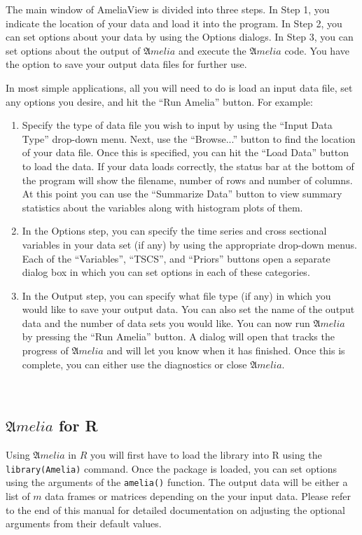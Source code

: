 \documentclass[12pt,titlepage]{article}
\newcommand{\Amelia}{\ensuremath{\mathfrak Amelia} }
\begin{document}
The main window of AmeliaView is divided into three steps.  In Step 1,
you indicate the location of your data and load it into the program.
In Step 2, you can set options about your data by using the Options
dialogs.  In Step 3, you can set options about the output of
${\mathfrak Amelia}$ and execute the ${\mathfrak Amelia}$ code.  You
have the option to save your output data files for further use.

In most simple applications, all you will need to do is load an input
data file, set any options you desire, and hit the ``Run Amelia''
button.  For example:
\begin{enumerate}
\item Specify the type of data file you wish to input by using the
  ``Input Data Type'' drop-down menu.  Next, use the ``Browse...''
  button to find the location of your data file.  Once this is
  specified, you can hit the ``Load Data'' button to load the data.
  If your data loads correctly, the status bar at the bottom of the
  program will show the filename, number of rows and number of
  columns.  At this point you can use the ``Summarize Data'' button to
  view summary statistics about the variables along with histogram
  plots of them.
\item In the Options step, you can specify the time series and cross
  sectional variables in your data set (if any) by using the
  appropriate drop-down menus.  Each of the ``Variables'', ``TSCS'',
  and ``Priors'' buttons open a separate dialog box in which you can
  set options in each of these categories.
\item In the Output step, you can specify what file type (if any) in
  which you would like to save your output data.  You can also set the
  name of the output data and the number of data sets you would like.
  You can now run ${\mathfrak Amelia}$ by pressing the ``Run Amelia''
  button.  A dialog will open that tracks the progress of ${\mathfrak
    Amelia}$ and will let you know when it has finished.  Once this is
  complete, you can either use the diagnostics or close ${\mathfrak
    Amelia}$.
\end{enumerate}

\ 
\subsection{\Amelia for R}
\label{sec:roverview}
Using \Amelia in $R$ you will first have to load the library into R
using the \texttt{library(Amelia)} command.  Once the package is
loaded, you can set options using the arguments of the
\texttt{amelia()} function.  The output data will be either a list of
$m$ data frames or matrices depending on the your input data.  Please
refer to the end of this manual for detailed documentation on
adjusting the optional arguments from their default values.
\end{document}
